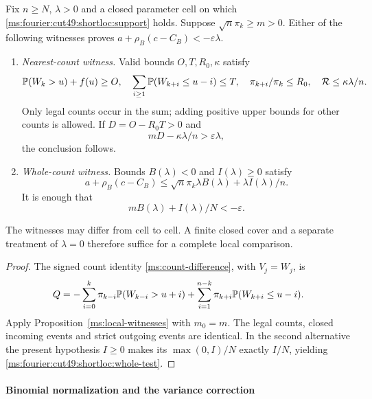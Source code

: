 \begin{theorem}\label{ms:fourier:cut49:shortloc:theorem}
Fix $n\ge N$, $\lambda>0$ and a closed parameter cell on which
\eqref{ms:fourier:cut49:shortloc:support} holds. Suppose $\sqrt n\pi_k\ge m>0$.
Either of the following witnesses proves $a+\rho_B(c-C_B)<-\varepsilon\lambda$.
\begin{enumerate}
\item \emph{Nearest-count witness.} Valid bounds $O,T,R_0,\kappa$ satisfy
\[
 \mathbb P(W_k>u)+f(u)\ge O,\quad
 \sum_{i\ge1}\mathbb P(W_{k+i}\le u-i)\le T,\quad
 \pi_{k+i}/\pi_k\le R_0,\quad \mathcal R\le\kappa\lambda/n.
\]
Only legal counts occur in the sum; adding positive upper bounds for
other counts is allowed. If $D=O-R_0T>0$ and
\begin{equation}\label{ms:fourier:cut49:shortloc:directtest}
             mD-\kappa\lambda/n>\varepsilon\lambda,
\end{equation}
the conclusion follows.
\item \emph{Whole-count witness.} Bounds $B(\lambda)<0$ and $I(\lambda)\ge0$
satisfy
\[
 a+\rho_B(c-C_B)\le\sqrt n\pi_k\lambda B(\lambda)
                                      +\lambda I(\lambda)/n.
\]
It is enough that
\begin{equation}\label{ms:fourier:cut49:shortloc:whole-test}
                  mB(\lambda)+I(\lambda)/N<-\varepsilon.
\end{equation}
\end{enumerate}
The witnesses may differ from cell to cell. A finite closed cover and a
separate treatment of $\lambda=0$ therefore suffice for a complete local
comparison.
\end{theorem}
\begin{proof}
The signed count identity \eqref{ms:count-difference}, with $V_j=W_j$, is
\begin{equation}\label{ms:fourier:cut49:shortloc:count}
 Q=-\sum_{i=0}^{k}\pi_{k-i}\mathbb P(W_{k-i}>u+i)
       +\sum_{i=1}^{n-k}\pi_{k+i}\mathbb P(W_{k+i}\le u-i).
\end{equation}
Apply Proposition~\ref{ms:local-witnesses} with $m_0=m$.
The legal counts, closed incoming events and strict outgoing events are
identical. In the second alternative the present hypothesis $I\ge0$
makes its $\max(0,I)/N$ exactly $I/N$, yielding
\eqref{ms:fourier:cut49:shortloc:whole-test}.
\end{proof}

\paragraph{Binomial normalization and the variance correction}

